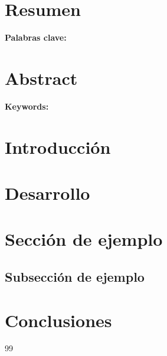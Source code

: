 \documentclass[12pt,a4paper]{article}
\begin{document}
	\onehalfspacing %
	
	\section*{Resumen}
		
	\vspace{0.5cm}
	\noindent\textbf{Palabras clave:} 
	
	\newpage
	
	\section*{Abstract}
	
	\vspace{0.5cm}
	\noindent\textbf{Keywords:} 
	
	\newpage
	
	\tableofcontents
	\newpage
	
	\newpage
	\section*{Introducción}
	\newpage
	\section*{Desarrollo}
	\section {Sección de ejemplo}
	
	\subsection{Subsección de ejemplo}
	\newpage
	\section*{Conclusiones}
	
	\newpage
	
	\begin{thebibliography}{99}
		

		
		
	\end{thebibliography}
	
\end{document}
